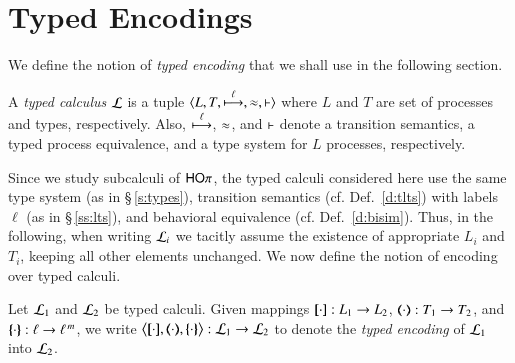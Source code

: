 

\newcommand{\stytra}[6]{\ensuremath{#1; #3 \proves #4 \hby{#2} #1; #5 \proves #6 }}

\newcommand{\wtytra}[6]{\ensuremath{#1; #3 \proves #4 \Hby{#2} #1; #5 \proves #6 }}

\newcommand{\wbb}[6]{\ensuremath{#1; #3 \proves #4 \wb #1; #5 \proves #6 }}



\newpage
\section{Typed Encodings}\label{s:expr}

We define the notion of \emph{typed encoding} that we
shall use in the following section.

\begin{definition}\label{d:tcalculus}\rm
	A \emph{typed calculus} $\mathcal{L}$ is a tuple
$		\langle L, T, \stackrel{\ell}{\longmapsto}, \approx, \vdash \rangle$
	where $L$ and $T$ are set of processes and types, respectively.
	Also, $\stackrel{\ell}{\longmapsto}$, $\approx$, and $\vdash$ 
	denote a transition semantics, a typed process equivalence, and a type system for $L$ processes, respectively. 
\end{definition}

Since we study subcalculi of $\mathsf{HO}\pi$, 
the typed calculi considered here 
use the same 
  type system (as in \S\,\ref{s:types}),
 transition semantics (cf. Def.~\ref{d:tlts}) with labels $\ell$ (as in  \S\,\ref{ss:lts}), 
 and behavioral equivalence (cf. Def.~\ref{d:bisim}). 
  Thus, in the following, when writing $\mathcal{L}_i$ we tacitly assume the existence of appropriate 
  $L_i$ and $T_i$, keeping all other elements unchanged.
 We now define the notion of encoding over typed calculi.

\begin{definition}\rm
	Let  $\mathcal{L}_1$ %
	and $\mathcal{L}_2$ %
	be typed calculi. %
	Given mappings $[\!\![\cdot]\!\!]: L_1 \to L_2$, 
	$(\!\!\langle\cdot\rangle\!\!): T_1 \to T_2$, and 
	$\{\!\!\{\cdot\}\!\!\}: \ell \to \ell^{\,m}$, 
	we write 
	$\enco{\map{\cdot}, \mapt{\cdot}, \mapa{\cdot}} : \tyl{L}_1 \to \tyl{L}_2$
	to denote the \emph{typed encoding} of $\mathcal{L}_1$ into $\mathcal{L}_2$.
\end{definition}

